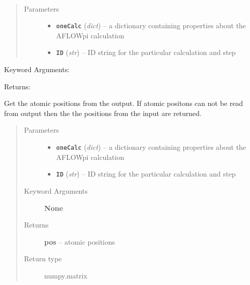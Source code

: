 \documentclass[letterpaper,10pt,english]{sphinxmanual}
\begin{document}
\begin{fulllineitems}
\label{retr:retr.getPositionsFromInput}~\begin{quote}\begin{description}
\item[{Parameters}] \leavevmode\begin{itemize}
\item {} 
\textbf{\texttt{oneCalc}} (\emph{dict}) -- a dictionary containing properties about the AFLOWpi calculation

\item {} 
\textbf{\texttt{ID}} (\emph{str}) -- ID string for the particular calculation and step

\end{itemize}

\end{description}\end{quote}

Keyword Arguments:

Returns:

\end{fulllineitems}


\begin{fulllineitems}
\label{retr:retr.getPositionsFromOutput}
Get the atomic positions from the output. If atomic positons can not be read from
output then the the positions from the input are returned.
\begin{quote}\begin{description}
\item[{Parameters}] \leavevmode\begin{itemize}
\item {} 
\textbf{\texttt{oneCalc}} (\emph{dict}) -- a dictionary containing properties about the AFLOWpi calculation

\item {} 
\textbf{\texttt{ID}} (\emph{str}) -- ID string for the particular calculation and step

\end{itemize}

\item[{Keyword Arguments}] \leavevmode
\textbf{None}

\item[{Returns}] \leavevmode
\textbf{pos} --
atomic positions

\item[{Return type}] \leavevmode
numpy.matrix

\end{description}\end{quote}

\end{fulllineitems}
\end{document}
